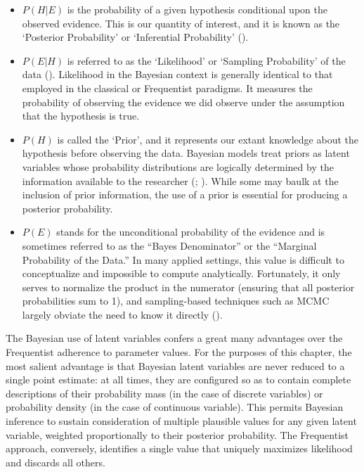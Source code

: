 \documentclass[
  12pt,
  a4paper,
  DIV=11,
  numbers=noendperiod,
  twoside,
  open=any]{scrartcl}
\providecommand{\tightlist}{%
  \setlength{\itemsep}{0pt}\setlength{\parskip}{0pt}}\usepackage{longtable,booktabs,array}
\begin{document}
\begin{itemize}
\tightlist
\item
  \(P(H|E)\) is the probability of a given hypothesis conditional upon
  the observed evidence. This is our quantity of interest, and it is
  known as the `Posterior Probability' or `Inferential Probability'
  ().
\item
  \(P(E|H)\) is referred to as the `Likelihood' or `Sampling
  Probability' of the data (). Likelihood in the Bayesian context is generally identical to
  that employed in the classical or Frequentist paradigms. It measures
  the probability of observing the evidence we did observe under the
  assumption that the hypothesis is true.
\item
  \(P(H)\) is called the `Prior', and it represents our extant knowledge
  about the hypothesis before observing the data. Bayesian models treat
  priors as latent variables whose probability distributions are
  logically determined by the information available to the researcher
  (;
  ). While some may
  baulk at the inclusion of prior information, the use of a prior is
  essential for producing a posterior probability.
\item
  \(P(E)\) stands for the unconditional probability of the evidence and
  is sometimes referred to as the ``Bayes Denominator'' or the
  ``Marginal Probability of the Data.'' In many applied settings, this
  value is difficult to conceptualize and impossible to compute
  analytically. Fortunately, it only serves to normalize the product in
  the numerator (ensuring that all posterior probabilities sum to 1),
  and sampling-based techniques such as MCMC largely obviate the need to
  know it directly ().
\end{itemize}

The Bayesian use of latent variables confers a great many advantages
over the Frequentist adherence to parameter values. For the purposes of
this chapter, the most salient advantage is that Bayesian latent
variables are never reduced to a single point estimate: at all times,
they are configured so as to contain complete descriptions of their
probability mass (in the case of discrete variables) or probability
density (in the case of continuous variable). This permits Bayesian
inference to sustain consideration of multiple plausible values for any
given latent variable, weighted proportionally to their posterior
probability. The Frequentist approach, conversely, identifies a single
value that uniquely maximizes likelihood and discards all others.
\end{document}
